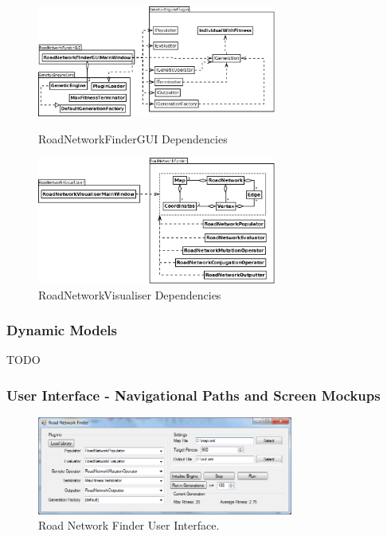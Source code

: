 \begin{figure}[ht!]
 \caption{RoadNetworkFinderGUI Dependencies}
 \centering
 \includegraphics[width=0.7\textwidth]{../RoadNetworkFinderGUI.png}\label{fig:RoadNetworkFinderGUIDependencies}
\end{figure}

\begin{figure}[ht!]
 \caption{RoadNetworkVisualiser Dependencies}\label{fig:RoadNetworkVisualiserDependencies}
 \centering
 \includegraphics[width=0.7\textwidth]{../RoadNetworkVisualiser.png}
\end{figure}

\clearpage

\subsubsection{Dynamic Models}
TODO

\subsubsection{User Interface - Navigational Paths and Screen Mockups}
\begin{figure}[ht!]
 \caption{Road Network Finder User Interface.}
 \centering
 \includegraphics[width=0.75\textwidth]{../Finder.png}
\end{figure}

